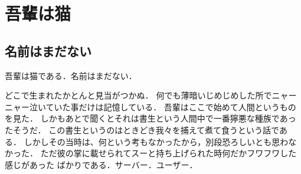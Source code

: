 \documentclass[openany,11pt,report]{ltjsbook}
\begin{document}
\chapter{吾輩は猫}
\section{名前はまだない}
吾輩は猫である．名前はまだない．

どこで生まれたかとんと見当がつかぬ．
何でも薄暗いじめじめした所でニャーニャー泣いていた事だけは記憶している．
吾輩はここで始めて人間というものを見た．
しかもあとで聞くとそれは書生という人間中で一番獰悪な種族であったそうだ．
この書生というのはときどき我々を捕えて煮て食うという話である．
しかしその当時は、何という考もなかったから，別段恐ろしいとも思わなかった．
ただ彼の掌に載せられてスーと持ち上げられた時何だかフワフワした感じがあった
ばかりである．サーバー．ユーザー．
\end{document}
